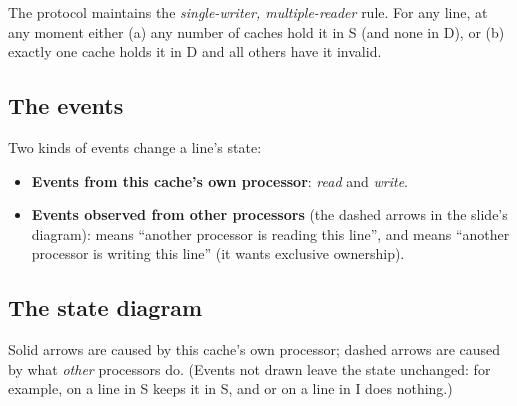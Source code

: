 \begin{keyidea}
The protocol maintains the \emph{single-writer, multiple-reader} rule. For any line, at any moment either
(a) any number of caches hold it in S (and none in D), or (b) exactly one cache holds it in D and all others have it invalid.
\end{keyidea}

\subsection{The events}

Two kinds of events change a line's state:
\begin{itemize}
  \item \textbf{Events from this cache's own processor}: \emph{read} and \emph{write}.
  \item \textbf{Events observed from other processors} (the dashed arrows in the slide's diagram):
        \Cread{} means ``another processor is reading this line'', and \Cwrite{} means ``another processor is writing
        this line'' (it wants exclusive ownership).
\end{itemize}

\subsection{The state diagram}

\begin{center}
\end{center}

Solid arrows are caused by this cache's own processor; dashed arrows are caused by what \emph{other} processors do.
(Events not drawn leave the state unchanged: for example, \Cread{} on a line in S keeps it in S, and \Cread{} or
\Cwrite{} on a line in I does nothing.)

